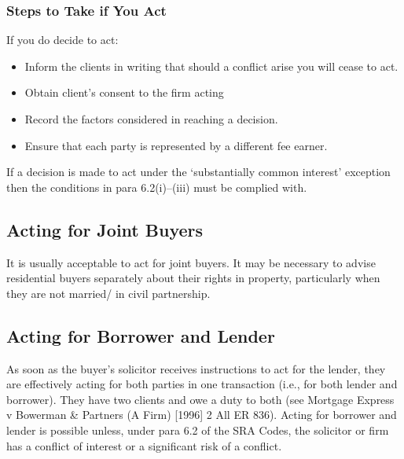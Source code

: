 \documentclass[
]{article}
\providecommand{\tightlist}{%
  \setlength{\itemsep}{0pt}\setlength{\parskip}{0pt}}
\begin{document}
\hypertarget{steps-to-take-if-you-act}{%
\subsubsection{Steps to Take if You
Act}\label{steps-to-take-if-you-act}}

If you do decide to act:

\begin{itemize}
\tightlist
\item
  Inform the clients in writing that should a conflict arise you will
  cease to act.
\item
  Obtain client's consent to the firm acting
\item
  Record the factors considered in reaching a decision.
\item
  Ensure that each party is represented by a different fee earner.
\end{itemize}

If a decision is made to act under the `substantially common interest'
exception then the conditions in para 6.2(i)--(iii) must be complied
with.

\hypertarget{acting-for-joint-buyers}{%
\subsection{Acting for Joint Buyers}\label{acting-for-joint-buyers}}

It is usually acceptable to act for joint buyers. It may be necessary to
advise residential buyers separately about their rights in property,
particularly when they are not married/ in civil partnership.

\hypertarget{acting-for-borrower-and-lender}{%
\subsection{Acting for Borrower and
Lender}\label{acting-for-borrower-and-lender}}

As soon as the buyer's solicitor receives instructions to act for the
lender, they are effectively acting for both parties in one transaction
(i.e., for both lender and borrower). They have two clients and owe a
duty to both (see Mortgage Express v Bowerman \& Partners (A Firm)
{[}1996{]} 2 All ER 836). Acting for borrower and lender is possible
unless, under para 6.2 of the SRA Codes, the solicitor or firm has a
conflict of interest or a significant risk of a conflict.
\end{document}
